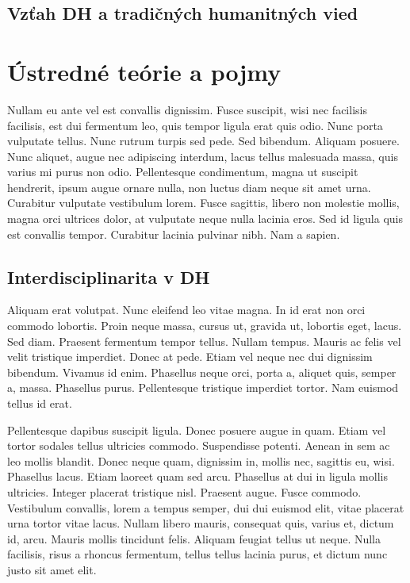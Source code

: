\documentclass[
  titlepage,
  openright,
  DIV=calc,
  toc=listof,
  listof=nochaptergap]{scrbook}
\begin{document}
\section{Vzťah DH a tradičných humanitných
vied}\label{vzux165ah-dh-a-tradiux10dnuxfdch-humanitnuxfdch-vied}

\chapter{Ústredné teórie a pojmy}\label{sec:ustredneteorie}

Nullam eu ante vel est convallis dignissim. Fusce suscipit, wisi nec
facilisis facilisis, est dui fermentum leo, quis tempor ligula erat quis
odio. Nunc porta vulputate tellus. Nunc rutrum turpis sed pede. Sed
bibendum. Aliquam posuere. Nunc aliquet, augue nec adipiscing interdum,
lacus tellus malesuada massa, quis varius mi purus non odio.
Pellentesque condimentum, magna ut suscipit hendrerit, ipsum augue
ornare nulla, non luctus diam neque sit amet urna. Curabitur vulputate
vestibulum lorem. Fusce sagittis, libero non molestie mollis, magna orci
ultrices dolor, at vulputate neque nulla lacinia eros. Sed id ligula
quis est convallis tempor. Curabitur lacinia pulvinar nibh. Nam a
sapien.

\section{Interdisciplinarita v DH}\label{interdisciplinarita-v-dh}

Aliquam erat volutpat. Nunc eleifend leo vitae magna. In id erat non
orci commodo lobortis. Proin neque massa, cursus ut, gravida ut,
lobortis eget, lacus. Sed diam. Praesent fermentum tempor tellus. Nullam
tempus. Mauris ac felis vel velit tristique imperdiet. Donec at pede.
Etiam vel neque nec dui dignissim bibendum. Vivamus id enim. Phasellus
neque orci, porta a, aliquet quis, semper a, massa. Phasellus purus.
Pellentesque tristique imperdiet tortor. Nam euismod tellus id erat.

Pellentesque dapibus suscipit ligula. Donec posuere augue in quam. Etiam
vel tortor sodales tellus ultricies commodo. Suspendisse potenti. Aenean
in sem ac leo mollis blandit. Donec neque quam, dignissim in, mollis
nec, sagittis eu, wisi. Phasellus lacus. Etiam laoreet quam sed arcu.
Phasellus at dui in ligula mollis ultricies. Integer placerat tristique
nisl. Praesent augue. Fusce commodo. Vestibulum convallis, lorem a
tempus semper, dui dui euismod elit, vitae placerat urna tortor vitae
lacus. Nullam libero mauris, consequat quis, varius et, dictum id, arcu.
Mauris mollis tincidunt felis. Aliquam feugiat tellus ut neque. Nulla
facilisis, risus a rhoncus fermentum, tellus tellus lacinia purus, et
dictum nunc justo sit amet elit.
\end{document}
